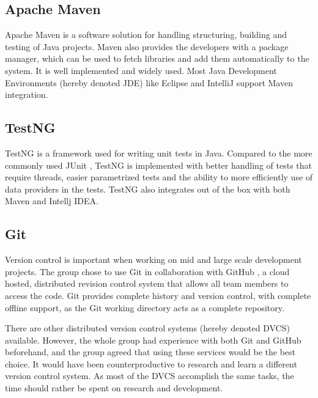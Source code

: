 \subsection{Apache Maven}
\label{subsec:prestudies-tools-apache_maven}

Apache Maven is a software solution for handling structuring, building and testing of Java projects. Maven also provides the developers with a package manager, which can be used to fetch libraries and add them automatically to the system. It is well implemented and widely used. Most Java Development Environments (hereby denoted JDE) like Eclipse and IntelliJ support Maven integration.

\subsection{TestNG}
\label{subsec:prestudies-tools-testng}

TestNG \cite{test-ng} is a framework used for writing unit tests in Java. Compared to the more commonly used JUnit \cite{junit}, TestNG is implemented with better handling of tests that require threads, easier parametrized tests and the ability to more efficiently use of data providers in the tests. TestNG also integrates out of the box with both Maven and Intellj IDEA.

\subsection{Git}
\label{subsec:prestudies-tools-git}

Version control is important when working on mid and large scale development projects. The group chose to use Git \cite{git} in collaboration with GitHub \cite{github}, a cloud hosted, distributed revision control system that allows all team members to access the code. Git provides complete history and version control, with complete offline support, as the Git working directory acts as a complete repository.

There are other distributed version control systems (hereby denoted DVCS) available. However, the whole group had experience with both Git and GitHub beforehand, and the group agreed that using these services would be the best choice. It would have been counterproductive to research and learn a different version control system. As most of the DVCS accomplish the same tasks, the time should rather be spent on research and development.


